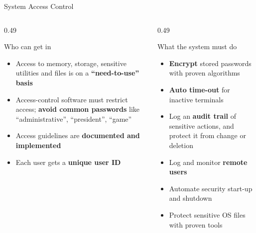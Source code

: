 \documentclass[aspectratio=169,11pt,xcolor={table}]{beamer}
\begin{document}
\begin{frame}{System Access Control}
  \begin{columns}[T]
    \begin{column}{0.49\textwidth}
      \begin{block}{Who can get in}
        \small
        \begin{itemize}\setlength{\itemsep}{2pt}
          \item Access to memory, storage, sensitive utilities and files is on a \textbf{``need-to-use'' basis}
          \item Access-control software must restrict access; \textbf{avoid common passwords} like ``administrative'', ``president'', ``game''
          \item Access guidelines are \textbf{documented and implemented}
          \item Each user gets a \textbf{unique user ID}
        \end{itemize}
      \end{block}
    \end{column}
    \begin{column}{0.49\textwidth}
      \begin{exampleblock}{What the system must do}
        \small
        \begin{itemize}\setlength{\itemsep}{2pt}
          \item \textbf{Encrypt} stored passwords with proven algorithms
          \item \textbf{Auto time-out} for inactive terminals
          \item Log an \textbf{audit trail} of sensitive actions, and protect it from change or deletion
          \item Log and monitor \textbf{remote users}
          \item Automate security start-up and shutdown
          \item Protect sensitive OS files with proven tools
        \end{itemize}
      \end{exampleblock}
    \end{column}
  \end{columns}
\end{frame}
\end{document}
